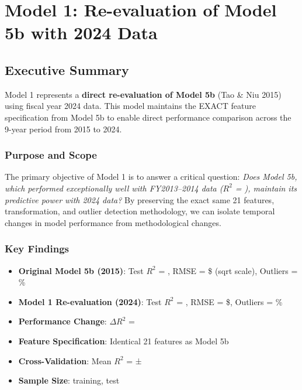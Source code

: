 \chapter{Model 1: Re-evaluation of Model 5b with 2024 Data}\label{ch:model1}




\def\themodel{1}

\section{Executive Summary}

Model 1 represents a \textbf{direct re-evaluation of Model 5b} (Tao \& Niu 2015) using fiscal year 2024 data. This model maintains the EXACT feature specification from Model 5b to enable direct performance comparison across the 9-year period from 2015 to 2024.

\subsection{Purpose and Scope}

The primary objective of Model 1 is to answer a critical question: \textit{Does Model 5b, which performed exceptionally well with FY2013--2014 data ($R^2$ = \ModelOneFiveBRSquaredTwoThousandFifteen), maintain its predictive power with 2024 data?} By preserving the exact same 21 features, transformation, and outlier detection methodology, we can isolate temporal changes in model performance from methodological changes.

\subsection{Key Findings}

\begin{itemize}
    \item \textbf{Original Model 5b (2015)}: Test $R^2$ = \ModelOneFiveBRSquaredTwoThousandFifteen, RMSE = \$\ModelOneFiveBRMSETwoThousandFifteen{} (sqrt scale), Outliers = \ModelOneFiveBOutlierPctTwoThousandFifteen\%
    \item \textbf{Model 1 Re-evaluation (2024)}: Test $R^2$ = \MRSquaredTest, RMSE = \$\MRMSETest, Outliers = \MOutlierPct\%
    \item \textbf{Performance Change}: $\Delta$$R^2$ = \ModelOneRSquaredDeltaFromTwoThousandFifteen
    \item \textbf{Feature Specification}: Identical 21 features as Model 5b
    \item \textbf{Cross-Validation}: Mean $R^2$ = \MCVMean{} ± \MCVStd
    \item \textbf{Sample Size}: \MTrainingSamples{} training, \MTestSamples{} test
\end{itemize}

